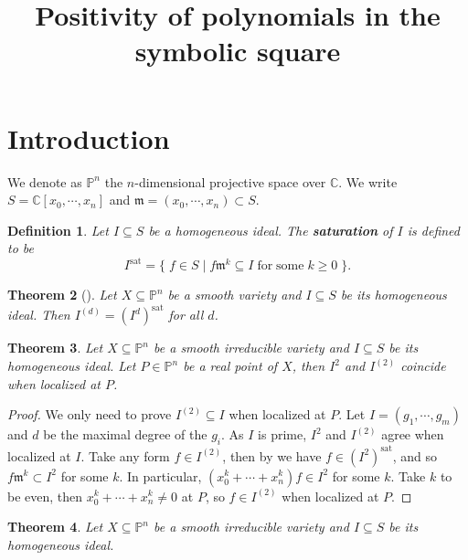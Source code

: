 \documentclass[dvipsnames,10pt]{article}
\title{\Large \textbf{Positivity of polynomials in the symbolic square}}
\date{}
\newcommand{\bb}[1]{\mathbb{#1}}
\newcommand{\m}{\mathfrak{m}}
\newcommand{\sat}{^\mathrm{sat}}
\newtheorem{theorem}{Theorem}[section]
\newtheorem{defi}[theorem]{Definition}
\begin{document}
\maketitle
\section{Introduction}

We denote as $\bb{P}^n$ the $n$-dimensional projective space over $\bb{C}$. We write $S=\bb{C}[x_0,\cdots,x_n]$ and $\m=(x_0,\cdots,x_n)\subset S$.

\begin{defi}
    Let $I\subseteq S$ be a homogeneous ideal. The \textbf{saturation} of $I$ is defined to be
    \begin{equation*}
        I\sat = \{ \; f\in S \mid f\m^k\subseteq I\mathrm{\;for\;some\;}k\geqslant 0 \; \}.
    \end{equation*}
\end{defi}

\begin{theorem}[\cite{SAT}]
    Let $X\subseteq \bb{P}^n$ be a smooth variety and $I\subseteq S$ be its homogeneous ideal. Then $I^{(d)}=(I^d)\sat$ for all $d$.
\end{theorem}

\begin{theorem}
    Let $X\subseteq \bb{P}^n$ be a smooth irreducible variety and $I\subseteq S$ be its homogeneous ideal. Let $P\in \bb{P}^n$ be a real point of $X$, then $I^2$ and $I^{(2)}$ coincide when localized at $P$.
\end{theorem}

\begin{proof}
    We only need to prove $I^{(2)}\subseteq I$ when localized at $P$. Let $I=(g_1,\cdots,g_m)$ and $d$ be the maximal degree of the $g_i$. As $I$ is prime, $I^2$ and $I^{(2)}$ agree when localized at $I$. Take any form $f\in I^{(2)}$, then by  we have $f\in (I^2)\sat$, and so $f\m^k\subset I^2$ for some $k$. In particular, $(x_0^k+\cdots+x_n^k)f\in I^2$ for some $k$. Take $k$ to be even, then $x_0^k+\cdots+x_n^k\neq 0$ at $P$, so $f\in I^{(2)}$ when localized at $P$.
\end{proof}

\begin{theorem}
    Let $X\subseteq \bb{P}^n$ be a smooth irreducible variety and $I\subseteq S$ be its homogeneous ideal.
\end{theorem}



\newpage


\end{document}
